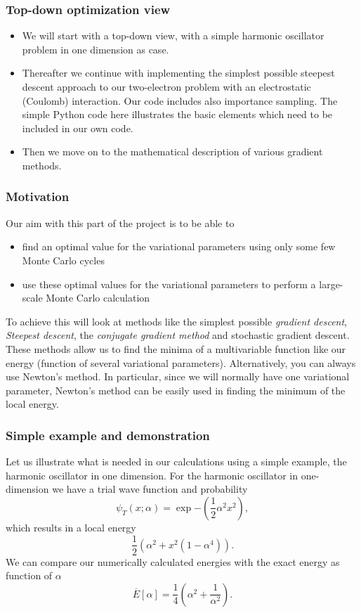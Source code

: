 \documentclass{beamer}
\begin{document}
\begin{frame}
\frametitle{Top-down optimization view}

\begin{itemize}
\item We will start with a top-down view, with a simple harmonic oscillator problem in one dimension as case.

\item Thereafter we continue with implementing the simplest possible steepest descent approach to our two-electron problem with an electrostatic (Coulomb) interaction. Our code includes also importance sampling. The simple Python code here illustrates the basic elements which need to be included in our own code.

\item Then we move on to the mathematical description of various gradient methods.
\end{itemize}

\noindent
\end{frame}

\begin{frame}
\frametitle{Motivation}

\begin{block}{}
Our aim with this part of the project is to be able to
\begin{itemize}
\item find an optimal value for the variational parameters using only some few Monte Carlo cycles

\item use these optimal values for the variational parameters to perform a large-scale Monte Carlo calculation
\end{itemize}

\noindent
To achieve this will look at methods like the simplest possible \emph{gradient descent}, \emph{Steepest descent}, the \emph{conjugate gradient method} and stochastic gradient descent.
These methods allow us to find
the minima of a multivariable  function like our energy (function of several variational parameters). 
Alternatively, you can always use Newton's method. In particular, since we will normally have one variational parameter,
Newton's method can be easily used in finding the minimum of the local energy.

\end{block}
\end{frame}

\begin{frame}
\frametitle{Simple example and demonstration}

Let us illustrate what is needed in our calculations using a simple example, the harmonic oscillator in one dimension.
For the harmonic oscillator in one-dimension we have a  trial wave function and probability
\[
\psi_T(x;\alpha) = \exp{-(\frac{1}{2}\alpha^2x^2)},
\]
which results in a local energy 
\[
\frac{1}{2}\left(\alpha^2+x^2(1-\alpha^4)\right).
\]
We can compare our numerically calculated energies with the exact energy as function of $\alpha$
\[
\overline{E}[\alpha] = \frac{1}{4}\left(\alpha^2+\frac{1}{\alpha^2}\right).
\]
\end{frame}
\end{document}

